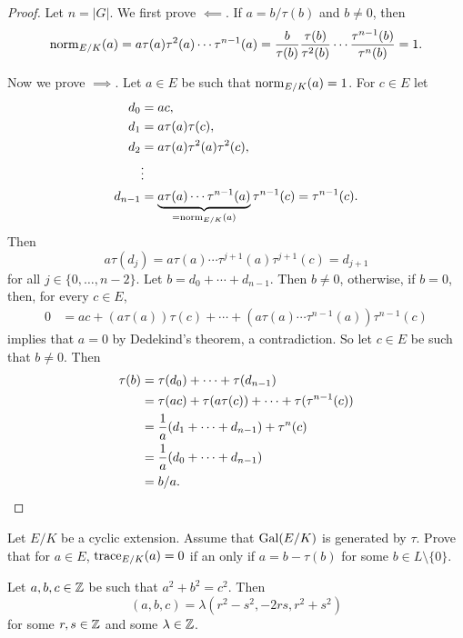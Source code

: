 \begin{proof}
    Let $n=|G|$. We first prove $\impliedby$. If $a=b/\tau(b)$ and $b\ne 0$, then 
    \[
    \operatorname{norm}_{E/K}(a)=a\tau(a)\tau^2(a)\cdots\tau^{n-1}(a)
    =\frac{b}{\tau(b)}\frac{\tau(b)}{\tau^2(b)}\cdots\frac{\tau^{n-1}(b)}{\tau^n(b)}=1.
    \]

    Now we prove $\implies$. Let $a\in E$ be such that $\operatorname{norm}_{E/K}(a)=1$. For 
    $c\in E$ let 
    \begin{align*}
        d_0 &= ac,\\
        d_1 &= a\tau(a)\tau(c),\\
        d_2 &= a\tau(a)\tau^2(a)\tau^2(c),\\
        &\vdots\\
        d_{n-1} &= \underbrace{a\tau(a)\cdots\tau^{n-1}(a)}_{=\operatorname{norm}_{E/K}(a)}\tau^{n-1}(c)=\tau^{n-1}(c).
    \end{align*}
    Then 
    \[
    a\tau(d_j)=a\tau(a)\cdots\tau^{j+1}(a)\tau^{j+1}(c)=d_{j+1}
    \]
    for all $j\in\{0,\dots,n-2\}$. Let $b=d_0+\cdots+d_{n-1}$. Then 
    $b\ne 0$, otherwise, if $b=0$, then, for every $c\in E$, 
    \begin{align*}
    0&=ac+(a\tau(a))\tau(c)+\cdots+(a\tau(a)\cdots\tau^{n-1}(a))\tau^{n-1}(c)
    \end{align*}
    implies that $a=0$ by Dedekind's theorem, a contradiction. So let $c\in E$ be
    such that $b\ne 0$. Then 
    \begin{align*}
    \tau(b)&=\tau(d_0)+\cdots+\tau(d_{n-1})\\
    &=\tau(ac)+\tau(a\tau(c))+\cdots+\tau(\tau^{n-1}(c))\\
    &=\frac{1}{a}(d_1+\cdots+d_{n-1})+\tau^n(c)\\
    &=\frac{1}{a}(d_0+\cdots+d_{n-1})\\
    &=b/a.\qedhere
    \end{align*}
\end{proof}

\begin{exercise}
    Let $E/K$ be a cyclic extension. Assume that 
    $\operatorname{Gal}(E/K)$ is generated by $\tau$. Prove that for 
    $a\in E$, $\operatorname{trace}_{E/K}(a)=0$ if an only 
    if $a=b-\tau(b)$ for some $b\in L\setminus\{0\}$.  
\end{exercise}

\begin{corollary}
    Let $a,b,c\in \mathbb{Z}$ be such that $a^2+b^2=c^2$. Then 
    \[
    (a,b,c)=\lambda(r^2-s^2,-2rs, r^2+s^2)
    \]
    for some $r,s\in\mathbb{Z}$ and some $\lambda\in\mathbb{Z}$.
\end{corollary}

